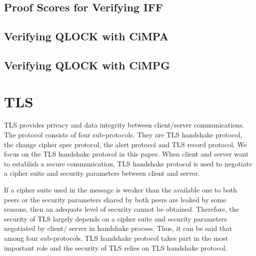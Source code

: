 \documentclass[a4paper,fleqn]{cas-dc}
\begin{document}
\subsection{Proof Scores for Verifying IFF} \label{pscores}

\subsection{Verifying QLOCK with CiMPA} \label{cimpa}

\subsection{Verifying QLOCK with CiMPG} \label{cimpg}

\section{TLS}\label{tls}
TLS \cite{dierk} provides privacy and data integrity between client/server communications. The protocol consists of four sub-protocols. They are TLS handshake protocol, the change cipher spec protocol, the alert protocol and TLS record protocol. We focus on the TLS handshake protocol in this paper. When client and server want to establish a secure communication, TLS handshake protocol is used to negotiate a cipher suite and security parameters between client and server. 


If a cipher suite used in the message is weaker than the available one to both peers or the security parameters shared by both peers are leaked by some reasons, then an adequate level of security cannot be obtained. Therefore, the security of TLS largely depends on a cipher suite and security parameters negotiated by client/ server in handshake process. Thus, it can be said that among four sub-protocols, TLS handshake protocol takes part in the most important role and the security of TLS relies on TLS handshake protocol. 
\end{document}
